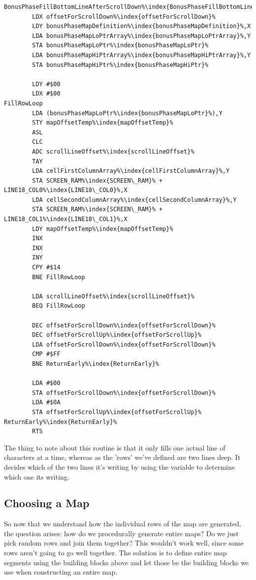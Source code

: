 \begin{minipage}[b]{0.45\linewidth}
\centering
\begin{lstlisting}[basicstyle=\tiny\ttfamily,escapechar=\%]
BonusPhaseFillBottomLineAfterScrollDown%\index{BonusPhaseFillBottomLineAfterScrollDown}%   
        LDX offsetForScrollDown%\index{offsetForScrollDown}%
        LDY bonusPhaseMapDefinition%\index{bonusPhaseMapDefinition}%,X
        LDA bonusPhaseMapLoPtrArray%\index{bonusPhaseMapLoPtrArray}%,Y
        STA bonusPhaseMapLoPtr%\index{bonusPhaseMapLoPtr}%
        LDA bonusPhaseMapHiPtrArray%\index{bonusPhaseMapHiPtrArray}%,Y
        STA bonusPhaseMapHiPtr%\index{bonusPhaseMapHiPtr}%

        LDY #$00
        LDX #$00
FillRowLoop
        LDA (bonusPhaseMapLoPtr%\index{bonusPhaseMapLoPtr}%),Y
        STY mapOffsetTemp%\index{mapOffsetTemp}%
        ASL 
        CLC 
        ADC scrollLineOffset%\index{scrollLineOffset}%
        TAY 
        LDA cellFirstColumnArray%\index{cellFirstColumnArray}%,Y
        STA SCREEN_RAM%\index{SCREEN\_RAM}% + LINE18_COL0%\index{LINE18\_COL0}%,X
        LDA cellSecondColumnArray%\index{cellSecondColumnArray}%,Y
        STA SCREEN_RAM%\index{SCREEN\_RAM}% + LINE18_COL1%\index{LINE18\_COL1}%,X
        LDY mapOffsetTemp%\index{mapOffsetTemp}%
        INX 
        INX 
        INY 
        CPY #$14
        BNE FillRowLoop

        LDA scrollLineOffset%\index{scrollLineOffset}%
        BEQ FillRowLoop

        DEC offsetForScrollDown%\index{offsetForScrollDown}%
        DEC offsetForScrollUp%\index{offsetForScrollUp}%
        LDA offsetForScrollDown%\index{offsetForScrollDown}%
        CMP #$FF
        BNE ReturnEarly%\index{ReturnEarly}%

        LDA #$00
        STA offsetForScrollDown%\index{offsetForScrollDown}%
        LDA #$0A
        STA offsetForScrollUp%\index{offsetForScrollUp}%
ReturnEarly%\index{ReturnEarly}%
        RTS 
\end{lstlisting}
\end{minipage}

The thing to note about this routine is that it only fills one actual line of characters
at a time, whereas as the 'rows' we've defined are two lines deep. It decides which of the
two lines it's writing by using the  variable to determine which
one its writing.

\subsection{Choosing a Map}
So now that we understand how the individual rows of the map are generated, the question
arises: how do we procedurally generate entire maps? Do we just pick random rows and 
join them together? This wouldn't work well, since some rows aren't going to go well
together. The solution is to define entire map segments using the building blocks above
and let those be the building blocks we use when constructing an entire map.

